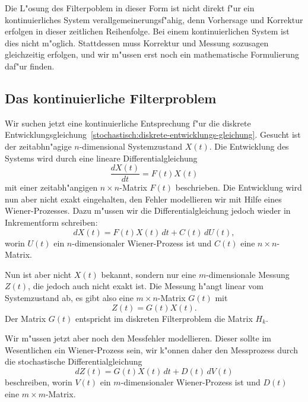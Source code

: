 Die L"osung des Filterpoblem in dieser Form ist nicht direkt f"ur ein
kontinuierliches System verallgemeinerungsf"ahig, denn Vorhersage und 
Korrektur erfolgen in dieser zeitlichen Reihenfolge.
Bei einem kontinuierlichen System ist dies nicht m"oglich.
Stattdessen muss Korrektur und Messung sozusagen gleichzeitig erfolgen,
und wir m"ussen erst noch ein mathematische Formulierung daf"ur finden.

%
%
\subsection{Das kontinuierliche Filterproblem}
Wir suchen jetzt eine kontinuierliche Entsprechung f"ur die diskrete
Entwicklungsgleichung~\eqref{stochastisch:diskrete-entwicklungs-gleichung}.
Gesucht ist der zeitabhn"agige $n$-dimensional Systemzustand $X(t)$. 
Die Entwicklung des Systems wird durch eine lineare Differentialgleichung
\[
\frac{dX(t)}{dt}
=
F(t) X(t)
\]
mit einer zeitabh"angigen $n\times n$-Matrix $F(t)$ beschrieben.
Die Entwicklung wird nun aber nicht exakt eingehalten, den Fehler
modellieren wir mit Hilfe eines Wiener-Prozesses.
Dazu m"ussen wir die Differentialgleichung jedoch wieder in Inkrementform
schreiben:
\begin{equation}
dX(t) = F(t) X(t)\,dt + C(t)\, dU(t),
\label{stochastisch:kontinuierliche-zeitentwicklung}
\end{equation}
worin $U(t)$ ein $n$-dimensionaler Wiener-Prozess ist und $C(t)$
eine $n\times n$-Matrix.

Nun ist aber nicht $X(t)$ bekannt, sondern nur eine $m$-dimensionale
Messung $Z(t)$, die jedoch auch nicht exakt ist.
Die Messung h"angt linear vom Systemzustand ab, es gibt also eine
$m\times n$-Matrix $G(t)$ mit 
\[
Z(t) = G(t) X(t).
\]
Der Matrix $G(t)$ entspricht im diskreten Filterproblem die Matrix $H_k$.

Wir m"ussen jetzt aber noch den Messfehler modellieren.
Dieser sollte im Wesentlichen ein Wiener-Prozess sein, wir k"onnen daher
den Messprozess durch die stochastische Differentialgleichung
\begin{equation}
dZ(t)
= 
G(t)X(t) \,dt +  D(t)\,dV(t)
\label{stochastisch:kontinuierlicher-messprozess}
\end{equation}
beschreiben,
worin $V(t)$ ein $m$-dimensionaler Wiener-Prozess ist und $D(t)$ 
eine $m\times m$-Matrix.

